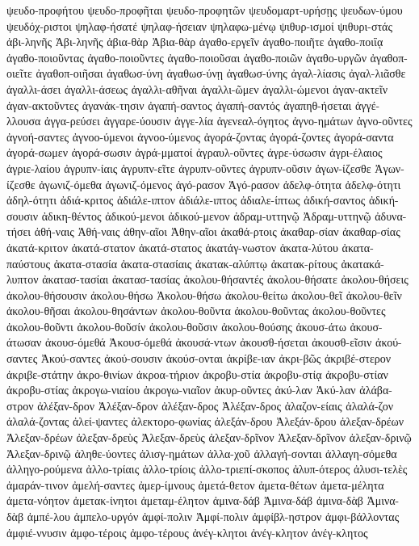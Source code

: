 {ψευδο-προφήτου
ψευδο-προφῆται
ψευδο-προφητῶν
ψευδομαρτ-υρήσῃς
ψευδων-ύμου
ψευδόχ-ριστοι
ψηλαφ-ήσατέ
ψηλαφ-ήσειαν
ψηλαφω-μένῳ
ψιθυρ-ισμοί
ψιθυρι-στάς
ἀβι-ληνῆς
Ἀβι-ληνῆς
ἀβια-θὰρ
Ἀβια-θὰρ
ἀγαθο-εργεῖν
ἀγαθο-ποιῆτε
ἀγαθο-ποιΐᾳ
ἀγαθο-ποιοῦντας
ἀγαθο-ποιοῦντες
ἀγαθο-ποιοῦσαι
ἀγαθο-ποιῶν
ἀγαθο-υργῶν
ἀγαθοπ-οιεῖτε
ἀγαθοπ-οιῆσαι
ἀγαθωσ-ύνη
ἀγαθωσ-ύνῃ
ἀγαθωσ-ύνης
ἀγαλ-λίασις
ἀγαλ-λιᾶσθε
ἀγαλλι-άσει
ἀγαλλι-άσεως
ἀγαλλι-αθῆναι
ἀγαλλι-ῶμεν
ἀγαλλι-ώμενοι
ἀγαν-ακτεῖν
ἀγαν-ακτοῦντες
ἀγανάκ-τησιν
ἀγαπή-σαντος
ἀγαπή-σαντός
ἀγαπηθ-ήσεται
ἀγγέ-λλουσα
ἀγγα-ρεύσει
ἀγγαρε-ύουσιν
ἀγγε-λία
ἀγενεαλ-όγητος
ἀγνο-ημάτων
ἀγνο-οῦντες
ἀγνοή-σαντες
ἀγνοο-ύμενοι
ἀγνοο-ύμενος
ἀγορά-ζοντας
ἀγορά-ζοντες
ἀγορά-σαντα
ἀγορά-σωμεν
ἀγορά-σωσιν
ἀγρά-μματοί
ἀγραυλ-οῦντες
ἀγρε-ύσωσιν
ἀγρι-έλαιος
ἀγριε-λαίου
ἀγρυπν-ίαις
ἀγρυπν-εῖτε
ἀγρυπν-οῦντες
ἀγρυπν-οῦσιν
ἀγων-ίζεσθε
Ἀγων-ίζεσθε
ἀγωνιζ-όμεθα
ἀγωνιζ-όμενος
ἀγό-ρασον
Ἀγό-ρασον
ἀδελφ-ότητα
ἀδελφ-ότητι
ἀδηλ-ότητι
ἀδιά-κριτος
ἀδιάλε-ιπτον
ἀδιάλε-ιπτος
ἀδιαλε-ίπτως
ἀδική-σαντος
ἀδική-σουσιν
ἀδικη-θέντος
ἀδικού-μενοι
ἀδικού-μενον
ἀδραμ-υττηνῷ
Ἀδραμ-υττηνῷ
ἀδυνα-τήσει
ἀθή-ναις
Ἀθή-ναις
ἀθην-αῖοι
Ἀθην-αῖοι
ἀκαθά-ρτοις
ἀκαθαρ-σίαν
ἀκαθαρ-σίας
ἀκατά-κριτον
ἀκατά-στατον
ἀκατά-στατος
ἀκατάγ-νωστον
ἀκατα-λύτου
ἀκατα-παύστους
ἀκατα-στασία
ἀκατα-στασίαις
ἀκατακ-αλύπτῳ
ἀκατακ-ρίτους
ἀκατακά-λυπτον
ἀκατασ-τασίαι
ἀκατασ-τασίας
ἀκολου-θήσαντές
ἀκολου-θήσατε
ἀκολου-θήσεις
ἀκολου-θήσουσιν
ἀκολου-θήσω
Ἀκολου-θήσω
ἀκολου-θείτω
ἀκολου-θεῖ
ἀκολου-θεῖν
ἀκολου-θῆσαι
ἀκολου-θησάντων
ἀκολου-θοῦντα
ἀκολου-θοῦντας
ἀκολου-θοῦντες
ἀκολου-θοῦντι
ἀκολου-θοῦσίν
ἀκολου-θοῦσιν
ἀκολου-θούσης
ἀκουσ-άτω
ἀκουσ-άτωσαν
ἀκουσ-όμεθά
Ἀκουσ-όμεθά
ἀκουσά-ντων
ἀκουσθ-ήσεται
ἀκουσθ-εῖσιν
ἀκού-σαντες
Ἀκού-σαντες
ἀκού-σουσιν
ἀκούσ-ονται
ἀκρίβε-ιαν
ἀκρι-βῶς
ἀκριβέ-στερον
ἀκριβε-στάτην
ἀκρο-θινίων
ἀκροα-τήριον
ἀκροβυ-στία
ἀκροβυ-στίᾳ
ἀκροβυ-στίαν
ἀκροβυ-στίας
ἀκρογω-νιαίου
ἀκρογω-νιαῖον
ἀκυρ-οῦντες
ἀκύ-λαν
Ἀκύ-λαν
ἀλάβα-στρον
ἀλέξαν-δρον
Ἀλέξαν-δρον
ἀλέξαν-δρος
Ἀλέξαν-δρος
ἀλαζον-είαις
ἀλαλά-ζον
ἀλαλά-ζοντας
ἀλεί-ψαντες
ἀλεκτορο-φωνίας
ἀλεξάν-δρου
Ἀλεξάν-δρου
ἀλεξαν-δρέων
Ἀλεξαν-δρέων
ἀλεξαν-δρεὺς
Ἀλεξαν-δρεὺς
ἀλεξαν-δρῖνον
Ἀλεξαν-δρῖνον
ἀλεξαν-δρινῷ
Ἀλεξαν-δρινῷ
ἀληθε-ύοντες
ἀλισγ-ημάτων
ἀλλα-χοῦ
ἀλλαγή-σονται
ἀλλαγη-σόμεθα
ἀλληγο-ρούμενα
ἀλλο-τρίαις
ἀλλο-τρίοις
ἀλλο-τριεπί-σκοπος
ἀλυπ-ότερος
ἀλυσι-τελὲς
ἀμαράν-τινον
ἀμελή-σαντες
ἀμερ-ίμνους
ἀμετά-θετον
ἀμετα-θέτων
ἀμετα-μέλητα
ἀμετα-νόητον
ἀμετακ-ίνητοι
ἀμεταμ-έλητον
ἀμινα-δάβ
Ἀμινα-δάβ
ἀμινα-δὰβ
Ἀμινα-δὰβ
ἀμπέ-λου
ἀμπελο-υργόν
ἀμφί-πολιν
Ἀμφί-πολιν
ἀμφίβλ-ηστρον
ἀμφι-βάλλοντας
ἀμφιέ-ννυσιν
ἀμφο-τέροις
ἀμφο-τέρους
ἀνέγ-κλητοι
ἀνέγ-κλητον
ἀνέγ-κλητος
}
